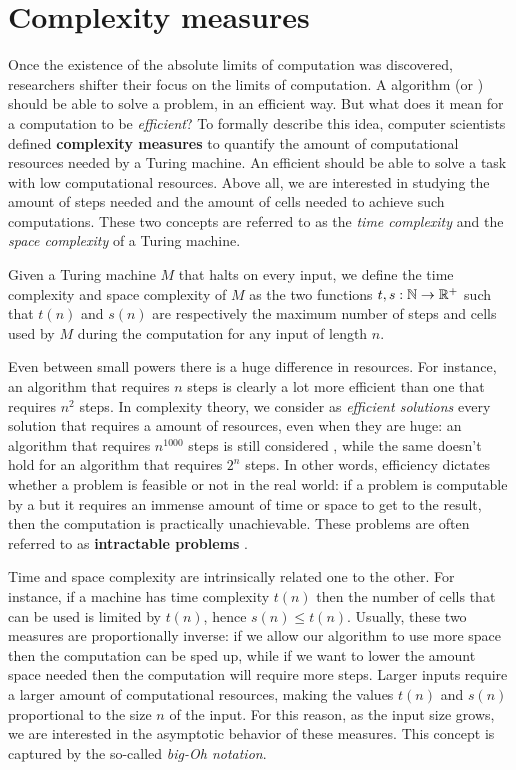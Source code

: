 \section{Complexity measures}

Once the existence of the absolute limits of computation was discovered, researchers shifter their focus on the  limits of computation. A  algorithm (or \TM) should be able to solve a problem, in an efficient way. But what does it mean for a computation to be \textit{efficient}? To formally describe this idea, computer scientists defined \textbf{complexity measures} to quantify the amount of computational resources needed by a Turing machine. An efficient \TM should be able to solve a task with low computational resources. Above all, we are interested in studying the amount of steps needed and the amount of cells needed to achieve such computations. These two concepts are referred to as the \textit{time complexity} and the \textit{space complexity} of a Turing machine.

\begin{definition}
 Given a Turing machine $M$ that halts on every input, we define the time complexity and space complexity of $M$ as the two functions $t, s : \mathbb{N} \to \mathbb{R}^+$ such that $t(n)$ and $s(n)$ are respectively the maximum number of steps and cells used by $M$ during the computation for any input of length $n$.
\end{definition}

Even between small powers there is a huge difference in resources. For instance, an algorithm that requires $n$ steps is clearly a lot more efficient than one that requires $n^2$ steps. In complexity theory, we consider as \textit{efficient solutions} every solution that requires a  amount of resources, even when they are huge: an algorithm that requires $n^{1000}$ steps is still considered , while the same doesn't hold for an algorithm that requires $2^n$ steps. In other words, efficiency dictates whether a problem is feasible or not in the real world: if a problem is computable by a \TM but it requires an immense amount of time or space to get to the result, then the computation is practically unachievable. These problems are often referred to as \textbf{intractable problems} \cite{complexity_arora_barak,sipser_computation}.

Time and space complexity are intrinsically related one to the other. For instance, if a machine has time complexity $t(n)$ then the number of cells that can be used is limited by $t(n)$, hence $s(n) \leq t(n)$. Usually, these two measures are proportionally inverse: if we allow our algorithm to use more space then the computation can be sped up, while if we want to lower the amount space needed then the computation will require more steps. Larger inputs require a larger amount of computational resources, making the values $t(n)$ and $s(n)$ proportional to the size $n$ of the input. For this reason, as the input size grows, we are interested in the asymptotic behavior of these measures. This concept is captured by the so-called \textit{big-Oh notation}.


